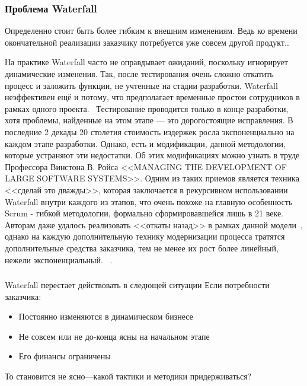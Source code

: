 \documentclass{../industrial-development}
\begin{document}
\begin{frame} \frametitle{Проблема Waterfall}
\begin {block}{}
Определенно стоит быть более \alert{гибким к внешним изменениям}. Ведь ко времени окончательной реализации заказчику потребуется уже совсем \alert{другой продукт}\dots
\end {block}
\end{frame}
\lecturenotes
На практике Waterfall часто не оправдывает ожиданий, поскольку игнорирует динамические изменения. Так, после тестирования очень сложно откатить процесс и заложить функции, не учтенные на стадии разработки. Waterfall неэффективен ещё и потому, что предполагает временные простои сотрудников в рамках одного проекта. ~\cite{MethodolyComparison}Тестирование проводится только в конце разработки, хотя проблемы, найденные на этом этапе — это дорогостоящие исправления. В последние 2 декады 20 столетия стоимость издержек росла экспоненциально на каждом этапе разработки. Однако, есть и модификации, данной методологии, которые устраняют эти недостатки. Об этих модификациях можно узнать в труде Профессора Винстона В. Ройса   <<MANAGING THE DEVELOPMENT OF LARGE SOFTWARE SYSTEMS>>. Одним из таких приемов является техника <<сделай это дважды>>, которая заключается в рекурсивном использовании Waterfall внутри каждого из этапов, что очень похоже на главную особенность Scrum - гибкой методологии, формально сформировавшейся лишь в 21 веке. Авторам даже удалось реализовать <<откаты назад>> в рамках данной модели~\cite[с.~335--338]{Winston}, однако на каждую дополнительную технику модернизации процесса тратятся дополнительные средства заказчика, тем не менее их рост более линейный, нежели экспоненциальный. ~\cite{Winston}.


\begin{frame} \frametitle{}
\begin {block}{Waterfall перестает действовать в следющей ситуации}
Если потребности заказчика:
 \begin{itemize}
\item Постоянно изменяются в \alert{динамическом бизнесе}
\item Не совсем или не до-конца ясны на \alert{начальном этапе}
\item Его финансы \alert {ограничены}
\end{itemize}
То становится не ясно---какой тактики и методики придерживаться?
\end {block}
\end{frame}
\end{document}

